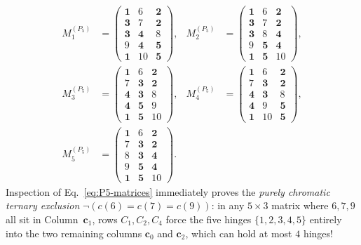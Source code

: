 \documentclass[aps,pra,reprint,superscriptaddress,longbibliography,nofootinbib,floatfix,10pt]{revtex4-2}
\theoremstyle{definition}\newtheorem{definition}[theorem]{Definition}
\theoremstyle{remark}\newtheorem{remark}[theorem]{Remark}
\begin{document}
\begin{equation}\label{eq:P5-matrices}
\begin{aligned}
M_1^{(P_5)}&=\begin{pmatrix}
\mathbf{1}&6&\mathbf{2}\\
\mathbf{3}&7&\mathbf{2}\\
\mathbf{3}&\mathbf{4}&8\\
9&\mathbf{4}&\mathbf{5}\\
\mathbf{1}&10&\mathbf{5}
\end{pmatrix},&
M_2^{(P_5)}&=\begin{pmatrix}
\mathbf{1}&6&\mathbf{2}\\
\mathbf{3}&7&\mathbf{2}\\
\mathbf{3}&8&\mathbf{4}\\
9&\mathbf{5}&\mathbf{4}\\
\mathbf{1}&\mathbf{5}&10
\end{pmatrix},\\[4pt]
M_3^{(P_5)}&=\begin{pmatrix}
\mathbf{1}&6&\mathbf{2}\\
7&\mathbf{3}&\mathbf{2}\\
\mathbf{4}&\mathbf{3}&8\\
\mathbf{4}&\mathbf{5}&9\\
\mathbf{1}&\mathbf{5}&10
\end{pmatrix},&
M_4^{(P_5)}&=\begin{pmatrix}
\mathbf{1}&6&\mathbf{2}\\
7&\mathbf{3}&\mathbf{2}\\
\mathbf{4}&\mathbf{3}&8\\
\mathbf{4}&9&\mathbf{5}\\
\mathbf{1}&10&\mathbf{5}
\end{pmatrix},\\[4pt]
M_5^{(P_5)}&=\begin{pmatrix}
\mathbf{1}&6&\mathbf{2}\\
7&\mathbf{3}&\mathbf{2}\\
8&\mathbf{3}&\mathbf{4}\\
9&\mathbf{5}&\mathbf{4}\\
\mathbf{1}&\mathbf{5}&10
\end{pmatrix}.
\end{aligned}
\end{equation}
Inspection of Eq.~\eqref{eq:P5-matrices} immediately proves the \emph{purely chromatic ternary exclusion} $\neg(c(6)=c(7)=c(9))$: in any $5\times 3$ matrix where $6,7,9$ all sit in Column~$\mathbf{c}_1$, rows $C_1,C_2,C_4$ force the five hinges $\{1,2,3,4,5\}$ entirely into the two remaining columns $\mathbf{c}_0$ and $\mathbf{c}_2$, which can hold at most $4$ hinges!
\end{document}
